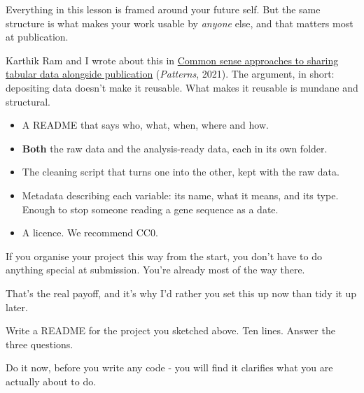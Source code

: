\documentclass[
  letterpaper,
  justified,
  a4paper]{tufte-book}
\providecommand{\tightlist}{%
  \setlength{\itemsep}{0pt}\setlength{\parskip}{0pt}}
\providecommand{\tightlist}{%
  \setlength{\itemsep}{0pt}\setlength{\parskip}{0pt}}
\begin{document}
\begin{tcolorbox}[enhanced jigsaw, arc=.35mm, bottomrule=.15mm, bottomtitle=1mm, breakable, colback=white, colbacktitle=quarto-callout-tip-color!10!white, colframe=quarto-callout-tip-color-frame, coltitle=black, left=2mm, leftrule=.75mm, opacityback=0, opacitybacktitle=0.6, rightrule=.15mm, title=\textcolor{quarto-callout-tip-color}{\faLightbulb}\hspace{0.5em}{This pays off when the project becomes a paper}, titlerule=0mm, toprule=.15mm, toptitle=1mm]

Everything in this lesson is framed around your future self. But the
same structure is what makes your work usable by \emph{anyone} else, and
that matters most at publication.

Karthik Ram and I wrote about this in
\href{https://www.cell.com/patterns/fulltext/S2666-3899(21)00230-0}{Common
sense approaches to sharing tabular data alongside publication}
(\emph{Patterns}, 2021). The argument, in short: depositing data doesn't
make it reusable. What makes it reusable is mundane and structural.

\begin{itemize}
\tightlist
\item
  A README that says who, what, when, where and how.
\item
  \textbf{Both} the raw data and the analysis-ready data, each in its
  own folder.
\item
  The cleaning script that turns one into the other, kept with the raw
  data.
\item
  Metadata describing each variable: its name, what it means, and its
  type. Enough to stop someone reading a gene sequence as a date.
\item
  A licence. We recommend CC0.
\end{itemize}

If you organise your project this way from the start, you don't have to
do anything special at submission. You're already most of the way there.

That's the real payoff, and it's why I'd rather you set this up now than
tidy it up later.

\end{tcolorbox}

\begin{tcolorbox}[enhanced jigsaw, arc=.35mm, bottomrule=.15mm, bottomtitle=1mm, breakable, colback=white, colbacktitle=quarto-callout-note-color!10!white, colframe=quarto-callout-note-color-frame, coltitle=black, left=2mm, leftrule=.75mm, opacityback=0, opacitybacktitle=0.6, rightrule=.15mm, title=\textcolor{quarto-callout-note-color}{\faInfo}\hspace{0.5em}{Your Turn}, titlerule=0mm, toprule=.15mm, toptitle=1mm]

Write a README for the project you sketched above. Ten lines. Answer the
three questions.

Do it now, before you write any code - you will find it clarifies what
you are actually about to do.

\end{tcolorbox}
\end{document}
